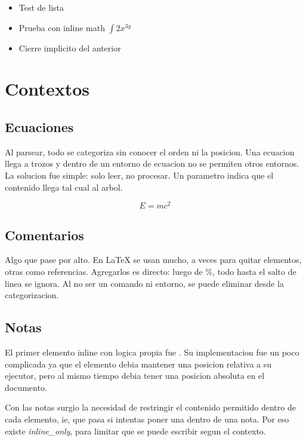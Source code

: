 \documentclass{article}
\begin{document}
  \begin{itemize}
      \item Test de lista
      \item Prueba con inline math $\int 2x^{3y}$
      \item Cierre implicito del anterior
  \end{itemize}

  \chapter{ Contextos }

  \section{ Ecuaciones }

  Al parsear, todo se categoriza sin conocer el orden ni la posicion. Una ecuacion
  llega a trozos y dentro de un entorno de ecuacion no se permiten otros entornos.
  La solucion fue simple: solo leer, no procesar. Un parametro
  indica que el contenido llega tal cual al arbol.

  \begin{equation}
      E = mc^2
  \end{equation}

  \section{ Comentarios }

  Algo que pase por alto. En LaTeX se usan mucho, a veces para quitar elementos,
  otras como referencias. Agregarlos es directo: luego de \%, todo hasta el
  salto de linea se ignora. Al no ser un comando ni entorno, se puede eliminar
  desde la categorizacion.

  \section{ Notas }

  El primer elemento inline con logica propia fue
  .
  Su implementacion fue un poco complicada ya que el elemento debia mantener
  una posicion relativa a su ejecutor, pero al mismo tiempo debia tener una
  posicion absoluta en el documento.

  Con las notas surgio la necesidad de restringir el contenido permitido
  dentro de cada elemento, ie, que pasa si intentas poner una
  dentro de una nota. Por eso existe \textit{inline\_only}, para limitar
  que se puede escribir segun el contexto.
\end{document}

